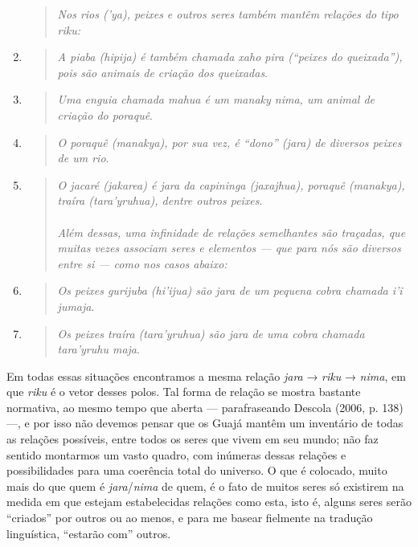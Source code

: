 \begin{enumerate}
\begin{quote}
  \emph{Nos rios ('\emph{ya}), peixes e outros seres também mantêm relações
    do tipo \emph{riku}:}
    \\
  \end{quote}
\item
  \begin{quote}
  \emph{A piaba (\emph{hipija}) é também chamada \emph{xaho pira} (``peixes do
    queixada''), pois são animais de criação dos queixadas}.
  \end{quote}
\item
  \begin{quote}
  \emph{Uma enguia chamada \emph{mahua} é um \emph{manaky} \emph{nima}, um
    animal de criação do poraquê}.
  \end{quote}
\item
  \begin{quote}
  \emph{O poraquê (\emph{manakya}), por sua vez, é ``dono'' (\emph{jara}) de
    diversos peixes de um rio}.
  \end{quote}
\item
  \begin{quote}
  \emph{O jacaré (\emph{jakarea}) é \emph{jara} da capininga
    (\emph{jaxajhua}), poraquê (\emph{manakya}), traíra
    (\emph{tara'yruhua}), dentre outros peixes}.\\
  ~\\
  \emph{Além dessas, uma infinidade de relações semelhantes são traçadas, que
    muitas vezes associam seres e elementos --- que para nós são diversos
    entre si --- como nos casos abaixo:}
    \\
  \end{quote}
\item
  \begin{quote}
  \emph{Os peixes gurijuba (\emph{hi'ijua}) são \emph{jara} de um pequena
    cobra chamada \emph{i'ĩ jumaja}}.
  \end{quote}
\item
  \begin{quote}
  \emph{Os peixes traíra (\emph{tara'yruhua}) são \emph{jara} de uma cobra
    chamada \emph{tara'yruhu maja}}.
  \end{quote}
\end{enumerate}

Em todas essas situações encontramos a mesma relação \emph{jara} →
\emph{riku} → \emph{nima}, em que \emph{riku} é o vetor desses polos.
Tal forma de relação se mostra bastante normativa, ao mesmo tempo que
aberta --- parafraseando Descola (2006, p. 138) ---, e por isso não devemos
pensar que os Guajá mantêm um inventário de todas as relações possíveis,
entre todos os seres que vivem em seu mundo; não faz sentido montarmos
um vasto quadro, com inúmeras dessas relações e possibilidades para uma
coerência total do universo. O que é colocado, muito mais do que quem é
\emph{jara}/\emph{nima} de quem, é o fato de muitos seres só existirem
na medida em que estejam estabelecidas relações como esta, isto é,
alguns seres serão ``criados'' por outros ou ao menos, e para me basear
fielmente na tradução linguística, ``estarão com'' outros.


